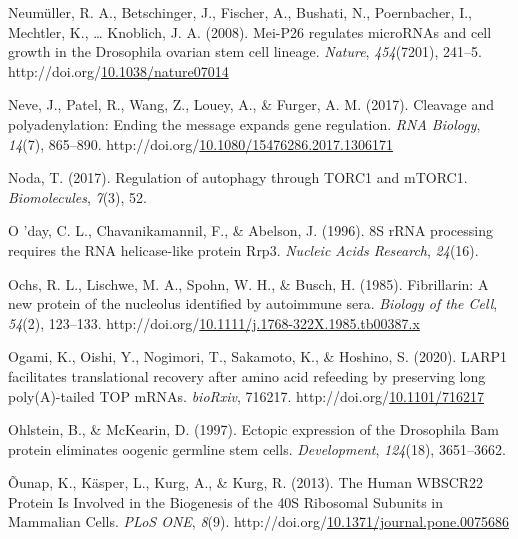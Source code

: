 \documentclass[12pt,oneside]{reedthesis}
\newlength{\cslhangindent}
\newenvironment{CSLReferences}[2] %
 {%
  \setlength{\parindent}{0pt}
  \ifodd #1 \everypar{\setlength{\hangindent}{\cslhangindent}}\ignorespaces\fi
  \ifnum #2 > 0
  \setlength{\parskip}{#2\baselineskip}
  \fi
 }%
 {}
\begin{document}
\begin{CSLReferences}{1}{0}
\leavevmode{}%
Neumüller, R. A., Betschinger, J., Fischer, A., Bushati, N., Poernbacher, I., Mechtler, K., \ldots{} Knoblich, J. A. (2008). Mei-{P26} regulates {microRNAs} and cell growth in the {Drosophila} ovarian stem cell lineage. \emph{Nature}, \emph{454}(7201), 241--5. http://doi.org/\href{https://doi.org/10.1038/nature07014}{10.1038/nature07014}

\leavevmode{}%
Neve, J., Patel, R., Wang, Z., Louey, A., \& Furger, A. M. (2017). Cleavage and polyadenylation: {Ending} the message expands gene regulation. \emph{RNA Biology}, \emph{14}(7), 865--890. http://doi.org/\href{https://doi.org/10.1080/15476286.2017.1306171}{10.1080/15476286.2017.1306171}

\leavevmode{}%
Noda, T. (2017). Regulation of autophagy through {TORC1} and {mTORC1}. \emph{Biomolecules}, \emph{7}(3), 52.

\leavevmode{}%
O 'day, C. L., Chavanikamannil, F., \& Abelson, J. (1996). {8S rRNA} processing requires the {RNA} helicase-like protein {Rrp3}. \emph{Nucleic Acids Research}, \emph{24}(16).

\leavevmode{}%
Ochs, R. L., Lischwe, M. A., Spohn, W. H., \& Busch, H. (1985). Fibrillarin: A new protein of the nucleolus identified by autoimmune sera. \emph{Biology of the Cell}, \emph{54}(2), 123--133. http://doi.org/\href{https://doi.org/10.1111/j.1768-322X.1985.tb00387.x}{10.1111/j.1768-322X.1985.tb00387.x}

\leavevmode{}%
Ogami, K., Oishi, Y., Nogimori, T., Sakamoto, K., \& Hoshino, S. (2020). {LARP1} facilitates translational recovery after amino acid refeeding by preserving long poly({A})-tailed {TOP mRNAs}. \emph{bioRxiv}, 716217. http://doi.org/\href{https://doi.org/10.1101/716217}{10.1101/716217}

\leavevmode{}%
Ohlstein, B., \& McKearin, D. (1997). Ectopic expression of the {Drosophila Bam} protein eliminates oogenic germline stem cells. \emph{Development}, \emph{124}(18), 3651--3662.

\leavevmode{}%
Õunap, K., Käsper, L., Kurg, A., \& Kurg, R. (2013). The {Human WBSCR22 Protein Is Involved} in the {Biogenesis} of the {40S Ribosomal Subunits} in {Mammalian Cells}. \emph{PLoS ONE}, \emph{8}(9). http://doi.org/\href{https://doi.org/10.1371/journal.pone.0075686}{10.1371/journal.pone.0075686}


\end{CSLReferences}
\end{document}
